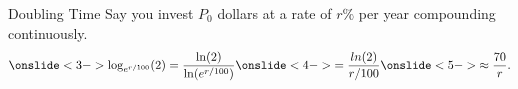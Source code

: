 \documentclass[Lecture.tex]{subfiles}
\begin{document}
\begin{frame}{Doubling Time}
  Say you invest $P_0$ dollars at a rate of $r\%$ per year compounding continuously.
  $$\onslide<3->{\log_{e^{r/100}}(2) = \frac{\ln(2)}{\ln(e^{r/100})}}\onslide<4->{ = \frac{ln(2)}{r/100}}\onslide<5->{ \approx \frac{70}{r}.}$$
\end{frame}
\end{document}
